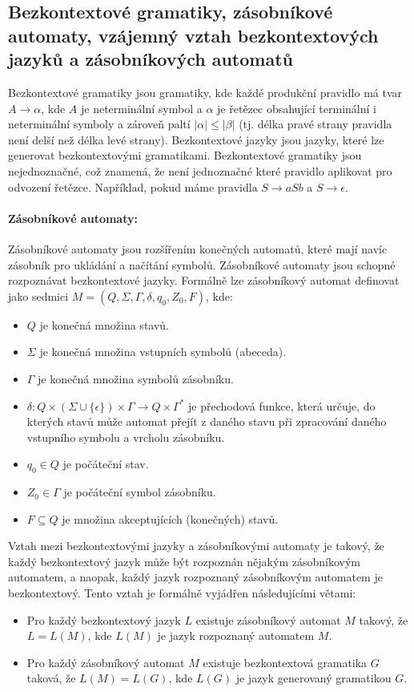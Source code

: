 \subsection{Bezkontextové gramatiky, zásobníkové automaty, vzájemný vztah bezkontextových jazyků a zásobníkových automatů}
Bezkontextové gramatiky jsou gramatiky, kde každé produkční pravidlo má 
tvar $A \to \alpha$, kde $A$ je neterminální symbol a $\alpha$ je řetězec obsahující terminální i
neterminální symboly a zároveň paltí $|\alpha| \leq |\beta|$ (tj. délka pravé strany pravidla není delší než délka levé strany). Bezkontextové jazyky jsou jazyky, které lze generovat bezkontextovými gramatikami.
Bezkontextové gramatiky jsou nejednoznačné, což znamená, že není jednoznačné které pravidlo
aplikovat pro odvození řetězce. Například, pokud máme pravidla $S \to aSb$ a $S \to \epsilon$.

\paragraph*{Zásobníkové automaty:} 

Zásobníkové automaty jsou rozšířením konečných automatů, které mají navíc zásobník pro 
ukládání a načítání symbolů. Zásobníkové automaty jsou schopné rozpoznávat bezkontextové jazyky.
Formálně lze zásobníkový automat definovat jako sedmici $M = (Q, \Sigma, \Gamma, \delta, q_0, Z_0, F)$, kde:
\begin{itemize}
\item $Q$ je konečná množina stavů.
\item $\Sigma$ je konečná množina vstupních symbolů (abeceda).
\item $\Gamma$ je konečná množina symbolů zásobníku.
\item $\delta: Q \times (\Sigma \cup \{\epsilon\}) \times \Gamma \to Q \times \Gamma^*$ je přechodová funkce, která určuje, do kterých stavů může automat přejít z daného stavu při zpracování daného vstupního symbolu a vrcholu zásobníku.

\item $q_0 \in Q$ je počáteční stav.
\item $Z_0 \in \Gamma$ je počáteční symbol zásobníku.
\item $F \subseteq Q$ je množina akceptujících (konečných) stavů.
\end{itemize}

Vztah mezi bezkontextovými jazyky a zásobníkovými automaty je takový, že každý 
bezkontextový jazyk může být rozpoznán nějakým zásobníkovým automatem, a naopak, 
každý jazyk rozpoznaný zásobníkovým automatem je bezkontextový. Tento vztah je 
formálně vyjádřen následujícími větami:
\begin{itemize}
\item Pro každý bezkontextový jazyk $L$ existuje zásobníkový automat $M$ takový, že $L = L(M)$, kde $L(M)$ je jazyk rozpoznaný automatem $M$.
\item Pro každý zásobníkový automat $M$ existuje bezkontextová gramatika $G$ taková, že $L(M) = L(G)$, kde $L(G)$ je jazyk generovaný gramatikou $G$.
\end{itemize}

